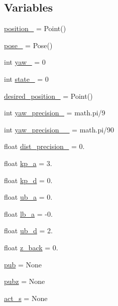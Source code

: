 \subsection*{Variables}
\begin{DoxyCompactItemize}
\item 
\hyperlink{namespacego__to__point__ball_aa399e57145dd0af7eefcd5fab4174fe9}{position\+\_\+} = Point()
\item 
\hyperlink{namespacego__to__point__ball_a03f1d8b257a2ae3d173a18c3fc2f8602}{pose\+\_\+} = Pose()
\item 
int \hyperlink{namespacego__to__point__ball_a74d8ca28c507d35baf1ea8e8f9595a78}{yaw\+\_\+} = 0
\item 
int \hyperlink{namespacego__to__point__ball_a0028df70b94b4041119cceba5e5aa79d}{state\+\_\+} = 0
\item 
\hyperlink{namespacego__to__point__ball_ac81a8393fb253c9e0b7255f779f16884}{desired\+\_\+position\+\_\+} = Point()
\item 
int \hyperlink{namespacego__to__point__ball_acc228d72c1ee47a43061e3563ac20d5c}{yaw\+\_\+precision\+\_\+} = math.\+pi/9
\item 
int \hyperlink{namespacego__to__point__ball_a1985c69cf8534ba0bd2c6080f788a992}{yaw\+\_\+precision\+\_\+\_\+} = math.\+pi/90
\item 
float \hyperlink{namespacego__to__point__ball_a9a02c8ca89a09909111972ec4fd317ca}{dist\+\_\+precision\+\_\+} = 0.
\item 
float \hyperlink{namespacego__to__point__ball_aac67ecb6c41141092b1ccaba4b537afc}{kp\+\_\+a} = 3.
\item 
float \hyperlink{namespacego__to__point__ball_aeb49969b88b7ca77d9abdeae42cb1964}{kp\+\_\+d} = 0.
\item 
float \hyperlink{namespacego__to__point__ball_aa5173a26f3502ea035d7c563bbf1fb05}{ub\+\_\+a} = 0.
\item 
float \hyperlink{namespacego__to__point__ball_ae6440cb2a8ea6e8e7d2327cb4cd12dd3}{lb\+\_\+a} = -\/0.
\item 
float \hyperlink{namespacego__to__point__ball_a1dabe6f24f898fa6f5303959917de757}{ub\+\_\+d} = 2.
\item 
float \hyperlink{namespacego__to__point__ball_a176944c73499ce72fa754c7e1a6d138d}{z\+\_\+back} = 0.
\item 
\hyperlink{namespacego__to__point__ball_a00b95c7141b558cd4466ca89d7c81640}{pub} = None
\item 
\hyperlink{namespacego__to__point__ball_ae3016b9645d9bd2b863a34a30115a6af}{pubz} = None
\item 
\hyperlink{namespacego__to__point__ball_a9ac8c67ea55b320e5eb2bdf665173ffa}{act\+\_\+s} = None
\end{DoxyCompactItemize}


